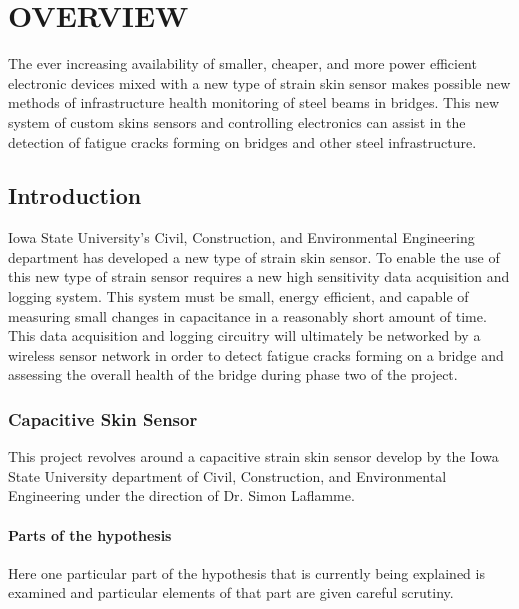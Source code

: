 \chapter{OVERVIEW}

The ever increasing availability of smaller, cheaper, and more power efficient electronic devices mixed with a new type of strain skin sensor makes possible new methods of infrastructure health monitoring of steel beams in bridges.  This new system of custom skins sensors and controlling electronics can assist in the detection of fatigue cracks forming on bridges and other steel infrastructure.

\section{Introduction}

Iowa State University's Civil, Construction, and Environmental Engineering department has developed a new type of strain skin sensor.  To enable the use of this new type of strain sensor requires a new high sensitivity data acquisition and logging system.  This system must be small, energy efficient, and capable of measuring small changes in capacitance in a reasonably short amount of time.  This data acquisition and logging circuitry will ultimately be networked by a wireless sensor network in order to detect fatigue cracks forming on a bridge and assessing the overall health of the bridge during phase two of the project.

\subsection{Capacitive Skin Sensor}

This project revolves around a capacitive strain skin sensor develop by the Iowa State University department of Civil, Construction, and Environmental Engineering under the direction of Dr. Simon Laflamme.  

\subsubsection{Parts of the hypothesis}

Here one particular part of the hypothesis that is 
currently being explained is examined and particular
elements of that part are given careful scrutiny.


